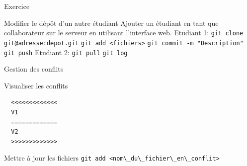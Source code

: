 \documentclass{beamer}
\begin{document}
\begin{frame}[fragile]{Exercice}
  \begin{exampleblock}{Modifier le dépôt d'un autre étudiant}
    Ajouter un étudiant en tant que collaborateur sur le serveur en utilisant l'interface web.\linebreak
    Etudiant 1:\linebreak
    \textcolor{commandcolor}{\verb?git clone git@adresse:depot.git?}\linebreak
    \linebreak
    \textcolor{commandcolor}{\verb?git add <fichiers>?}\linebreak
    \textcolor{commandcolor}{\verb?git commit -m "Description"?}\linebreak
    \textcolor{commandcolor}{\verb?git push?}\linebreak
    \linebreak
    Etudiant 2:\linebreak
    \textcolor{commandcolor}{\verb?git pull?}\linebreak
    \textcolor{commandcolor}{\verb?git log?}
  \end{exampleblock}
\end{frame}

\begin{frame}[fragile]{Gestion des conflits}
  \begin{block}{Visualiser les conflits}
\begin{verbatim}
  <<<<<<<<<<<<<
  V1
  =============
  V2
  >>>>>>>>>>>>>
\end{verbatim}
  \end{block}

  \begin{block}{Mettre à jour les fichiers}
    \textcolor{commandcolor}{\verb?git add <nom\_du\_fichier\_en\_conflit>?}
  \end{block}
\end{frame}
\end{document}
